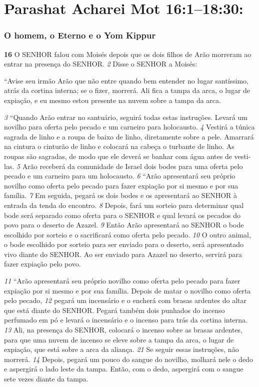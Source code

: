 \section*{Parashat Acharei Mot 16:1–18:30:}  

\subsubsection*{O homem, o Eterno e o Yom Kippur} 
\textbf{\large 16}
 O SENHOR falou com Moisés depois que os dois filhos de Arão morreram ao
entrar na presença do SENHOR. 
\textit{\tiny 2} 
Disse o SENHOR a Moisés: 

\smallskip
“Avise seu irmão Arão
que não entre quando bem entender no lugar santíssimo, atrás da cortina interna;
se o fizer, morrerá. Ali fica a tampa da arca, o lugar de expiação, e eu mesmo estou
presente na nuvem sobre a tampa da arca. 

\smallskip
\textit{\tiny 3} 
“Quando Arão entrar no santuário, seguirá todas estas instruções. Levará um
novilho para oferta pelo pecado e um carneiro para holocausto. 
\textit{\tiny 4} 
Vestirá a túnica
sagrada de linho e a roupa de baixo de linho, diretamente sobre a pele. Amarrará
na cintura o cinturão de linho e colocará na cabeça o turbante de linho. As roupas
são sagradas, de modo que ele deverá se banhar com água antes de vesti-las. 
\textit{\tiny 5} 
Arão receberá da comunidade de Israel dois bodes para uma oferta pelo pecado
e um carneiro para um holocausto. 
\textit{\tiny 6} 
“Arão apresentará seu próprio novilho como oferta pelo pecado para fazer
expiação por si mesmo e por sua família. 
\textit{\tiny 7} 
Em seguida, pegará os dois bodes e os
apresentará ao SENHOR à entrada da tenda do encontro. 
\textit{\tiny 8} 
Depois, fará um sorteio
para determinar qual bode será separado como oferta para o SENHOR e qual levará
os pecados do povo para o deserto de Azazel. 
\textit{\tiny 9} 
Então Arão apresentará ao SENHOR
o bode escolhido por sorteio e o sacrificará como oferta pelo pecado. 
\textit{\tiny 10}
O outro
animal, o bode escolhido por sorteio para ser enviado para o deserto, será
apresentado vivo diante do SENHOR. Ao ser enviado para Azazel no deserto, servirá
para fazer expiação pelo povo.
   
\smallskip
\textit{\tiny 11}
“Arão apresentará seu próprio novilho como oferta pelo pecado para fazer
expiação por si mesmo e por sua família. Depois de matar o novilho como oferta
pelo pecado, 
\textit{\tiny 12}
pegará um incensário e o encherá com brasas ardentes do altar
que está diante do SENHOR. Pegará também dois punhados do incenso perfumado
em pó e levará o incensário e o incenso para trás da cortina interna. 
\textit{\tiny 13}
Ali, na
presença do SENHOR, colocará o incenso sobre as brasas ardentes, para que uma
nuvem de incenso se eleve sobre a tampa da arca, o lugar de expiação, que está
sobre a arca da aliança.
\textit{\tiny 21}
 Se seguir essas instruções, não morrerá. 
\textit{\tiny 14}
Depois,
pegará um pouco do sangue do novilho, molhará nele o dedo e aspergirá o lado
leste da tampa. Então, com o dedo, aspergirá com o sangue sete vezes diante da
tampa.
   

